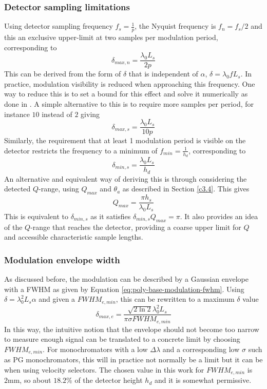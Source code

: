 \documentclass{article}
\begin{document}
\subsubsection{Detector sampling limitations}
Using detector sampling frequency $f_s = \frac{1}{p}$, the Nyquist frequency is $f_n = f_s/2$ and this an exclusive upper-limit at two samples per modulation period, corresponding to 
$$\delta_{max,n} = \frac{\lambda_0L_s}{2p}$$
This can be derived from the form of $\delta$ that is independent of $\alpha$, $\delta = \lambda_0 fL_s$. In practice, modulation visibility is reduced when approaching this frequency. One way to reduce this is to set a bound for this effect and solve it numerically as done in \cite{kusmin2017}. A simple alternative to this is to require more samples per period, for instance $10$ instead of $2$ giving
$$\delta_{max,s} = \frac{\lambda_0L_s}{10p}$$
Similarly, the requirement that at least 1 modulation period is visible on the detector restricts the frequency to a minimum of $f_{min} = \frac{1}{h_d}$, corresponding to 
$$\delta_{min,s} = \frac{\lambda_0L_s}{h_d}$$
An alternative and equivalent way of deriving this is through considering the detected $Q$-range, using $Q_{max}$ and $\theta_a$ as described in Section \ref{c3.4}. This gives 
$$Q_{max} = \frac{\pi h_s}{\lambda_0 L_s}$$
This is equivalent to $\delta_{min,s}$ as it satisfies $\delta_{min,s} Q_{max} = \pi$. It also provides an idea of the $Q$-range that reaches the detector, providing a coarse upper limit for $Q$ and accessible characteristic sample lengths. 

\subsubsection{Modulation envelope width}
As discussed before, the modulation can be described by a Gaussian envelope with a FWHM as given by Equation \eqref{eq:poly-base-modulation-fwhm}. Using $\delta = \lambda_0^2L_s\alpha$ and given a $FWHM_{e,min}$, this can be rewritten to a maximum $\delta$ value
$$\delta_{max,e} = \frac{\sqrt{2\ln 2}\lambda_0^2 L_s}{\pi\sigma FWHM_{e,min}}$$
In this way, the intuitive notion that the envelope should not become too narrow to measure enough signal can be translated to a concrete limit by choosing $FWHM_{e,min}$. For monochromators with a low $\Delta\lambda$ and a corresponding low $\sigma$ such as PG monochromators, this will in practice not normally be a limit but it can be when using velocity selectors. The chosen value in this work for $FWHM_{e,min}$ is $2 \unit{\milli\meter}$, so about $18.2$\% of the detector height $h_d$ and it is somewhat permissive.  
\end{document}
